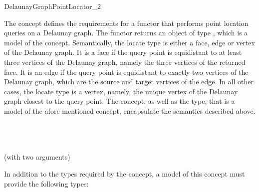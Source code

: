
\begin{ccRefFunctionObjectConcept}{DelaunayGraphPointLocator_2}

The  concept defines the requirements
for a functor that performs point location queries on a Delaunay
graph. The functor returns an object of type , which
is a model of the 
concept. Semantically, the locate type is either a face, edge or
vertex of the Delaunay graph. It is a face if the query point is
equidistant to at least three vertices of the Delaunay graph, namely
the three vertices of the returned face. It is an edge if the query
point is equidistant to exactly two vertices of the Delaunay graph,
which are the source and target vertices of the edge. In all other
cases, the locate type is a vertex, namely, the unique vertex of the
Delaunay graph closest to the query point. The
 concept, as well as the
 type, that is a model of the afore-mentioned concept,
encapsulate the semantics described above.

\ccRefines
{}\\
\\
\\
 (with two arguments)

\ccTypes

In addition to the types required by the 
concept, a model of this concept must provide the following types:


\ccThreeToTwo
{}
\ccGlue
{}
\ccGlue
{}
\ccGlue
{}
\ccGlue
{}
\ccGlue
{}


\end{ccRefFunctionObjectConcept}
